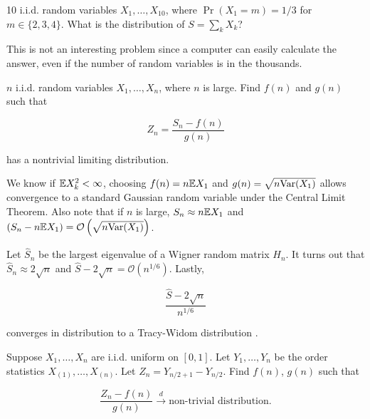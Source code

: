 \begin{example}

10 i.i.d. random variables \(X_1, \ldots, X_{10}\), where \(\Pr(X_1 = m) = 1/3\) for \(m \in \{2,3,4\}\). What is the distribution of \(S = \sum_k X_k\)?

\end{example}

This is not an interesting problem since a computer can easily calculate the answer, even if the number of random variables is in the thousands. 

\begin{example}

\(n\) i.i.d. random variables \(X_1, \ldots, X_{n}\), where \(n\) is large. Find \(f(n)\) and \(g(n)\) such that 

\[
Z_n = \frac{S_n - f(n)}{g(n)} 
\]

has a nontrivial limiting distribution. 

\end{example}

\begin{solution}

We know if \(\mathbb{E} X_k^2 < \infty\), choosing \(f(n) = n \mathbb{E} X_1\) and \(g(n) = \sqrt{n \mathrm{Var}(X_1)}\) allows convergence to a standard Gaussian random variable under the Central Limit Theorem. Also note that if \(n\) is large, \(S_n \approx n \mathbb{E} X_1\) and \((S_n - n \mathbb{E} X_1) = \mathcal{O} \left(\sqrt{n \mathrm{Var}(X_1)} \right)\). 

\end{solution}

Let \(\hat{S}_n\) be the largest eigenvalue of a Wigner random matrix \(H_n\). It turns out that \(\hat{S}_n \approx 2 \sqrt{n}\) and \(\hat{S} - 2 \sqrt{n} = \mathcal{O}(n^{1/6})\). Lastly,

\[
\frac{\hat{S} - 2 \sqrt{n} }{n^{1/6}}
\]

converges in distribution to a Tracy-Widom distribution \citep{Johnstone2001}.

\begin{exercise}

Suppose \(X_1, \ldots, X_n\) are i.i.d. uniform on \([0,1]\). Let \(Y_1, \ldots, Y_n\) be the order statistics \(X_{(1)}, \ldots, X_{(n)}\). Let \(Z_n = Y_{n/2 + 1} - Y_{n/2}\). Find \(f(n)\), \(g(n)\) such that 

\[
\frac{Z_n - f(n)}{g(n)} \xrightarrow{d} \text{non-trivial distribution.}
\]

\end{exercise}


